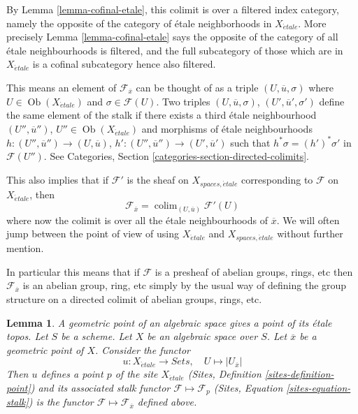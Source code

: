 \documentclass{stacks-project}
\newenvironment{slogan}{\comment}{\endcomment}
\theoremstyle{plain}
\newtheorem{lemma}[subsection]{Lemma}
\theoremstyle{definition}
\theoremstyle{remark}
\numberwithin{equation}{subsection}
\def\colim{\mathop{\mathrm{colim}}\nolimits}
\def\Ob{\mathop{\mathrm{Ob}}\nolimits}
\def\etale{{\acute{e}tale}}
\begin{document}
\noindent
By
Lemma \ref{lemma-cofinal-etale},
this colimit is over a filtered
index category, namely the opposite of the category of \'etale neighborhoods
in $X_\etale$. More precisely
Lemma \ref{lemma-cofinal-etale}
says the opposite of the category of all \'etale neighbourhoods is filtered,
and the full subcategory of those which are in $X_\etale$ is a cofinal
subcategory hence also filtered.

\medskip\noindent
This means an element of $\mathcal{F}_{\overline{x}}$ can be
thought of as a triple $(U, \overline{u}, \sigma)$ where
$U \in \Ob(X_\etale)$ and $\sigma \in \mathcal{F}(U)$.
Two triples $(U, \overline{u}, \sigma)$, $(U', \overline{u}', \sigma')$
define the same element of the stalk if there exists a third
\'etale neighbourhood
$(U'', \overline{u}'')$, $U'' \in \Ob(X_\etale)$
and morphisms of \'etale neighbourhoods
$h : (U'', \overline{u}'') \to (U, \overline{u})$,
$h' : (U'', \overline{u}'') \to (U', \overline{u}')$ such that
$h^*\sigma = (h')^*\sigma'$ in $\mathcal{F}(U'')$. See
Categories, Section \ref{categories-section-directed-colimits}.

\medskip\noindent
This also implies that if $\mathcal{F}'$ is the sheaf on
$X_{spaces, \etale}$ corresponding to $\mathcal{F}$ on
$X_\etale$, then
\begin{equation}
\label{equation-stalk-spaces-etale}
\mathcal{F}_{\overline{x}} = \colim_{(U, \overline{u})} \mathcal{F}'(U)
\end{equation}
where now the colimit is over all the \'etale neighbourhoods of $\overline{x}$.
We will often jump between the point of view of using $X_\etale$
and $X_{spaces, \etale}$ without further mention.

\medskip\noindent
In particular this means that if $\mathcal{F}$ is a presheaf of
abelian groups, rings, etc then $\mathcal{F}_{\overline{x}}$ is
an abelian group, ring, etc simply by the usual way of defining the
group structure on a directed colimit of abelian groups, rings, etc.

\begin{lemma}
\label{lemma-stalk-gives-point}
\begin{slogan}
A geometric point of an algebraic space gives a point of its \'etale topos.
\end{slogan}
Let $S$ be a scheme.
Let $X$ be an algebraic space over $S$.
Let $\overline{x}$ be a geometric point of $X$.
Consider the functor
$$
u : X_\etale \longrightarrow \textit{Sets}, \quad
U \longmapsto |U_{\overline{x}}|
$$
Then $u$ defines a point $p$ of the site $X_\etale$
(Sites, Definition \ref{sites-definition-point})
and its associated stalk functor $\mathcal{F} \mapsto \mathcal{F}_p$
(Sites, Equation \ref{sites-equation-stalk})
is the functor $\mathcal{F} \mapsto \mathcal{F}_{\overline{x}}$
defined above.
\end{lemma}
\end{document}
